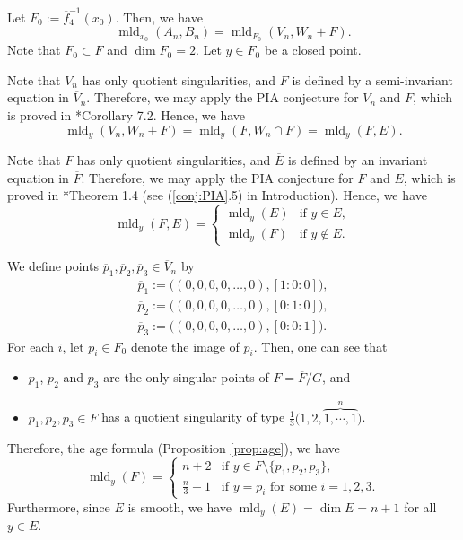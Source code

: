 \documentclass[a4paper,11pt]{amsart}
\theoremstyle{definition}
\theoremstyle{remark}
\begin{document}
Let $F_0 := \overline{f}_4 ^{-1} (x_0)$. 
Then, we have 
\[
\operatorname{mld}_{x_0}(A_n, B_n)  = \operatorname{mld}_{F_0}(V_n, W_n + F). \tag{i}
\]
Note that $F_0 \subset F$ and $\dim F_0 = 2$. 
Let $y \in F_0$ be a closed point. 

Note that $V_n$ has only quotient singularities, and $\overline{F}$ is defined by a semi-invariant equation in $\overline{V}_n$. 
Therefore, we may apply the PIA conjecture for $V_n$ and $F$, which is proved in \cite{NS3}*{Corollary 7.2}. 
Hence, we have 
\[
\operatorname{mld}_{y}(V_n, W_n + F) = \operatorname{mld}_{y}(F, W_n \cap F) = \operatorname{mld}_{y}(F, E). \tag{ii}
\]

Note that $F$ has only quotient singularities, and $\overline{E}$ is defined by an invariant equation in $\overline{F}$. 
Therefore, we may apply the PIA conjecture for $F$ and $E$, which is proved in \cite{NS22}*{Theorem 1.4} (see (\ref{conj:PIA}.5) in Introduction). 
Hence, we have 
\[
\operatorname{mld}_{y}(F, E) = 
\begin{cases}
\operatorname{mld}_{y}(E) & \text{if $y \in E$}, \\
\operatorname{mld}_{y}(F) & \text{if $y \not \in E$}. 
\end{cases} \tag{iii}
\]

We define points $\overline{p}_1, \overline{p}_2, \overline{p}_3 \in \overline{V}_n$ by 
\begin{align*}
\overline{p}_1 :=  \bigl( (0,0,0,0, \ldots, 0),[1 \colon 0 \colon 0] \bigr), \\
\overline{p}_2 :=  \bigl( (0,0,0,0, \ldots, 0),[0 \colon 1 \colon 0] \bigr), \\
\overline{p}_3 :=  \bigl( (0,0,0,0, \ldots, 0),[0 \colon 0 \colon 1] \bigr). 
\end{align*}
For each $i$, let $p_i \in F_0$ denote the image of $\overline{p}_i$. 
Then, one can see that 
\begin{itemize}
\item 
$p_1$, $p_2$ and $p_3$ are the only singular points of $F = \overline{F} /G$, and

\item 
$p_1, p_2, p_3 \in F$ has a quotient singularity of type $\frac{1}{3} \bigl( 1,2, \overbrace{1, \cdots , 1}^{n} \bigr)$. 
\end{itemize}
Therefore,  the age formula (Proposition \ref{prop:age}), we have 
\[
\operatorname{mld}_{y}(F) = 
\begin{cases}
n+2 & \text{if $y \in F \setminus \{ p_1, p_2, p_3 \}$}, \\
\frac{n}{3} + 1 & \text{if $y = p_i$ for some $i = 1,2,3$}. 
\end{cases}
\]
Furthermore, since $E$ is smooth, we have $\operatorname{mld}_{y}(E) = \dim E = n+1$ for all $y \in E$. 
\end{document}
